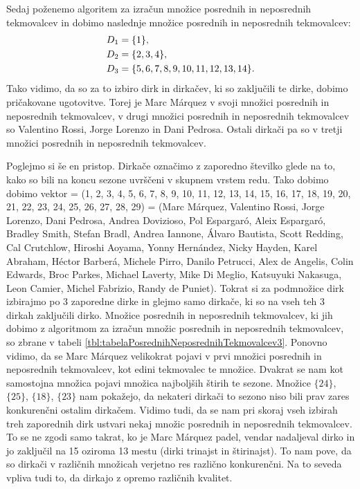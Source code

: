 \documentclass[a4paper, 12pt]{book}
\begin{document}
Sedaj poženemo algoritem za izračun množice posrednih in neposrednih tekmovalcev in dobimo naslednje množice posrednih in neposrednih tekmovalcev:
\begin{align}
    D_1 &= \{ 1 \},  \notag\\
    D_2 &= \{ 2, 3, 4 \}, \notag\\
    D_3 &= \{ 5, 6, 7, 8, 9, 10, 11, 12, 13, 14 \}. \notag
\end{align}
Tako vidimo, da so za to izbiro dirk in dirkačev, ki so zaključili te dirke, dobimo pričakovane ugotovitve. Torej je Marc Márquez v svoji množici posrednih in neposrednih tekmovalcev, v drugi množici posrednih in neposrednih tekmovalcev so Valentino Rossi, Jorge Lorenzo in Dani Pedrosa. Ostali dirkači pa so v tretji množici posrednih in neposrednih tekmovalcev.

Poglejmo si še en pristop. Dirkače označimo z zaporedno številko glede na to, kako so bili na koncu sezone uvrščeni v skupnem vrstem redu. Tako dobimo dobimo vektor = (1, 2, 3, 4, 5, 6, 7, 8, 9, 10, 11, 12, 13, 14, 15, 16, 17, 18, 19, 20, 21, 22, 23, 24, 25, 26, 27, 28, 29) = (Marc Márquez, Valentino Rossi, Jorge Lorenzo, Dani Pedrosa, Andrea Dovizioso, Pol Espargaró, Aleix Espargaró, Bradley Smith, Stefan Bradl, Andrea Iannone, Álvaro Bautista, Scott Redding, Cal Crutchlow, Hiroshi Aoyama, Yonny Hernández, Nicky Hayden, Karel Abraham, Héctor Barberá, Michele Pirro, Danilo Petrucci, Alex de Angelis, Colin Edwards, Broc Parkes, Michael Laverty, Mike Di Meglio, Katsuyuki Nakasuga, Leon Camier, Michel Fabrizio, Randy de Puniet). Tokrat si za podmnožice dirk izbirajmo po 3 zaporedne dirke in glejmo samo dirkače, ki so na vseh teh 3 dirkah zaključili dirko. Množice posrednih in neposrednih tekmovalcev, ki jih dobimo z algoritmom za izračun množic posrednih in neposrednih tekmovalcev, so zbrane v tabeli \ref{tbl:tabelaPosrednihNeposrednihTekmovalcev3}. Ponovno vidimo, da se Marc Márquez velikokrat pojavi v prvi množici posrednih in neposrednih tekmovalcev, kot edini tekmovalec te množice. Dvakrat se nam kot samostojna množica pojavi množica najboljših štirih te sezone. Množice $\{ 24 \}$, $\{ 25 \}$, $\{ 18 \}$, $\{ 23 \}$ nam pokažejo, da nekateri dirkači to sezono niso bili prav zares konkurenčni ostalim dirkačem. Vidimo tudi, da se nam pri skoraj vseh izbirah treh zaporednih dirk ustvari nekaj množic posrednih in neposrednih tekmovalcev. To se ne zgodi samo takrat, ko je Marc Márquez padel, vendar nadaljeval dirko in jo zaključil na 15 oziroma 13 mestu (dirki trinajst in štirinajst). To nam pove, da so dirkači v različnih množicah verjetno res različno konkurenčni. Na to seveda vpliva tudi to, da dirkajo z opremo različnih kvalitet. 
\end{document}
